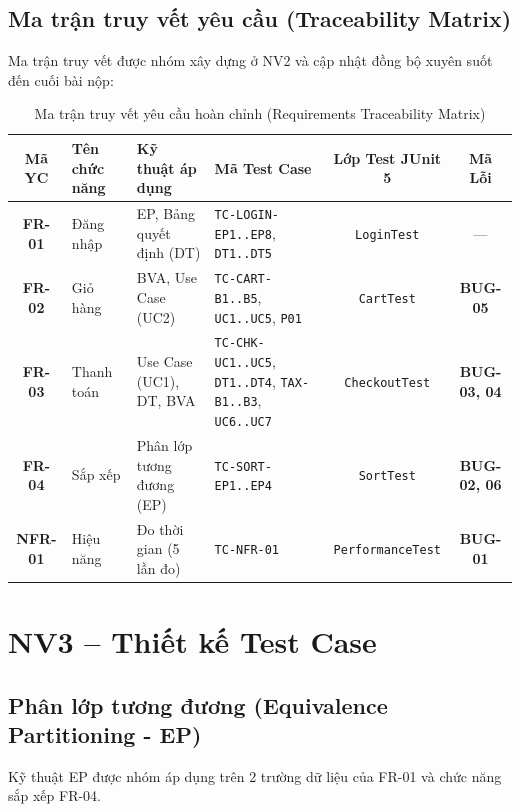 \documentclass[a4paper]{article}
\begin{document}
\subsection{Ma trận truy vết yêu cầu (Traceability Matrix)}
Ma trận truy vết được nhóm xây dựng ở NV2 và cập nhật đồng bộ xuyên suốt đến cuối bài nộp:
\begin{table}[H]
\centering
\small
\begin{tabularx}{\textwidth}{|c|l|X|p{3.8cm}|c|c|}
\hline
\textbf{Mã YC} & \textbf{Tên chức năng} & \textbf{Kỹ thuật áp dụng} & \textbf{Mã Test Case} & \textbf{Lớp Test JUnit 5} & \textbf{Mã Lỗi} \\ \hline
\textbf{FR-01} & Đăng nhập & EP, Bảng quyết định (DT) & \texttt{TC-LOGIN-EP1..EP8}, \texttt{DT1..DT5} & \texttt{LoginTest} & --- \\ \hline
\textbf{FR-02} & Giỏ hàng & BVA, Use Case (UC2) & \texttt{TC-CART-B1..B5}, \texttt{UC1..UC5}, \texttt{P01} & \texttt{CartTest} & \textbf{BUG-05} \\ \hline
\textbf{FR-03} & Thanh toán & Use Case (UC1), DT, BVA & \texttt{TC-CHK-UC1..UC5}, \texttt{DT1..DT4}, \texttt{TAX-B1..B3}, \texttt{UC6..UC7} & \texttt{CheckoutTest} & \textbf{BUG-03, 04} \\ \hline
\textbf{FR-04} & Sắp xếp & Phân lớp tương đương (EP) & \texttt{TC-SORT-EP1..EP4} & \texttt{SortTest} & \textbf{BUG-02, 06} \\ \hline
\textbf{NFR-01} & Hiệu năng & Đo thời gian (5 lần đo) & \texttt{TC-NFR-01} & \texttt{PerformanceTest} & \textbf{BUG-01} \\ \hline
\end{tabularx}
\caption{Ma trận truy vết yêu cầu hoàn chỉnh (Requirements Traceability Matrix)}
\end{table}

\clearpage
\section{NV3 – Thiết kế Test Case}

\subsection{Phân lớp tương đương (Equivalence Partitioning - EP)}
Kỹ thuật EP được nhóm áp dụng trên 2 trường dữ liệu của FR-01 và chức năng sắp xếp FR-04.
\end{document}
